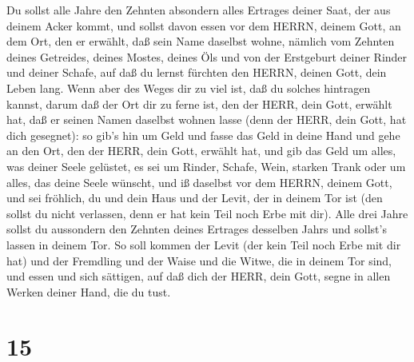  Du sollst alle Jahre den Zehnten absondern alles Ertrages
deiner Saat, der aus deinem Acker kommt,  und sollst davon
essen vor dem HERRN, deinem Gott, an dem Ort, den er erwählt, daß sein
Name daselbst wohne, nämlich vom Zehnten deines Getreides, deines
Mostes, deines Öls und von der Erstgeburt deiner Rinder und deiner
Schafe, auf daß du lernst fürchten den HERRN, deinen Gott, dein Leben
lang.  Wenn aber des Weges dir zu viel ist, daß du solches
hintragen kannst, darum daß der Ort dir zu ferne ist, den der HERR, dein
Gott, erwählt hat, daß er seinen Namen daselbst wohnen lasse (denn der
HERR, dein Gott, hat dich gesegnet):  so gib's hin um Geld
und fasse das Geld in deine Hand und gehe an den Ort, den der HERR, dein
Gott, erwählt hat,  und gib das Geld um alles, was deiner
Seele gelüstet, es sei um Rinder, Schafe, Wein, starken Trank oder um
alles, das deine Seele wünscht, und iß daselbst vor dem HERRN, deinem
Gott, und sei fröhlich, du und dein Haus  und der Levit,
der in deinem Tor ist (den sollst du nicht verlassen, denn er hat kein
Teil noch Erbe mit dir).  Alle drei Jahre sollst du
aussondern den Zehnten deines Ertrages desselben Jahrs und sollst's
lassen in deinem Tor.  So soll kommen der Levit (der kein
Teil noch Erbe mit dir hat) und der Fremdling und der Waise und die
Witwe, die in deinem Tor sind, und essen und sich sättigen, auf daß dich
der HERR, dein Gott, segne in allen Werken deiner Hand, die du tust.

\hypertarget{section-14}{%
\section{15}\label{section-14}}

